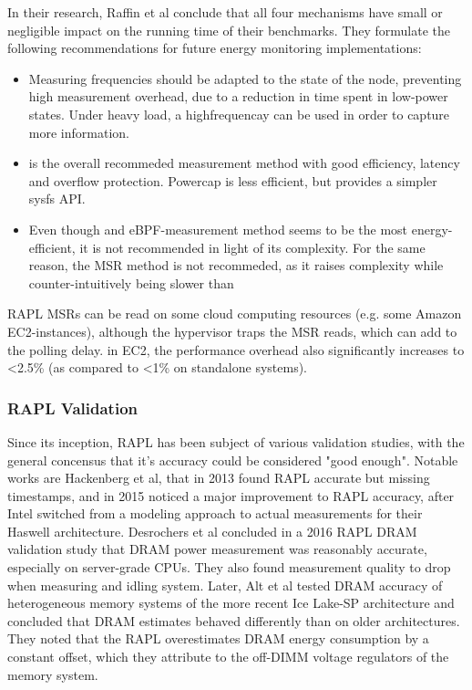 In their research, Raffin et al conclude that all four mechanisms have small or negligible impact on the running time of their benchmarks. They formulate the following recommendations for future energy monitoring implementations:
\begin{itemize}
    \item Measuring frequencies should be adapted to the state of the node, preventing high measurement overhead, due to a reduction in time spent in low-power states. Under heavy load, a highfrequencay can be used in order to capture more information.
    \item {} is the overall recommeded measurement method with good efficiency, latency and overflow protection. Powercap is less efficient, but provides a simpler sysfs API.
    \item Even though  and eBPF-measurement method seems to be the most energy-efficient, it is not recommended in light of its complexity. For the same reason, the MSR method is not recommeded, as it raises complexity while counter-intuitively being slower than 
\end{itemize}

RAPL MSRs can be read on some cloud computing resources (e.g. some Amazon EC2-instances), although the hypervisor traps the MSR reads, which can add to the polling delay. in EC2, the performance overhead also significantly increases to <2.5\% (as compared to <1\% on standalone systems)\parencite{jay2023experimental}.

\subsubsection{RAPL Validation}
\label{sec:raplvalidation}
Since its inception, RAPL has been subject of various validation studies, with the general concensus that it's accuracy could be considered "good enough"\parencite{raffin2024dissecting}. Notable works are Hackenberg et al, that in 2013 found RAPL accurate but missing timestamps\parencite{hackenberg2013power}, and in 2015 noticed a major improvement to RAPL accuracy, after Intel switched from a modeling approach to actual measurements for their Haswell architecture\parencite{hackenberg2015energy}. Desrochers et al concluded in a 2016 RAPL DRAM validation study\parencite{desrochers2016validation} that DRAM power measurement was reasonably accurate, especially on server-grade CPUs. They also found measurement quality to drop when measuring and idling system. Later, Alt et al\parencite{alt2024experimental} tested DRAM accuracy of heterogeneous memory systems of the more recent Ice Lake-SP architecture and concluded that DRAM estimates behaved differently than on older architectures. They noted that the RAPL overestimates DRAM energy consumption by a constant offset, which they attribute to the off-DIMM voltage regulators of the memory system.

